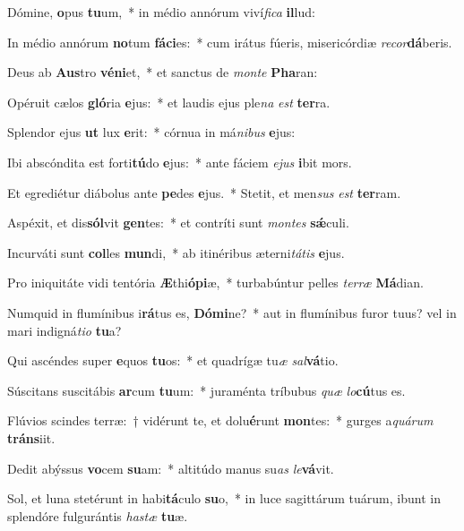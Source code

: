 \item Dómine, \textbf{o}pus \textbf{tu}um,~* in médio annórum viví\textit{fi}\textit{ca} \textbf{il}lud:
\item In médio annórum \textbf{no}tum \textbf{fá}\textbf{ci}es:~* cum irátus fúeris, misericórdiæ \textit{re}\textit{cor}\textbf{dá}beris.
\item Deus ab \textbf{Aus}tro \textbf{vé}\textbf{ni}et,~* et sanctus de \textit{mon}\textit{te} \textbf{Pha}ran:
\item Opéruit cælos \textbf{gló}ria \textbf{e}jus:~* et laudis ejus ple\textit{na} \textit{est} \textbf{ter}ra.
\item Splendor ejus \textbf{ut} lux \textbf{e}rit:~* córnua in má\textit{ni}\textit{bus} \textbf{e}jus:
\item Ibi abscóndita est forti\textbf{tú}do \textbf{e}jus:~* ante fáciem \textit{e}\textit{jus} \textbf{i}bit mors.
\item Et egrediétur diábolus ante \textbf{pe}des \textbf{e}jus.~* Stetit, et men\textit{sus} \textit{est} \textbf{ter}ram.
\item Aspéxit, et dis\textbf{sól}vit \textbf{gen}tes:~* et contríti sunt \textit{mon}\textit{tes} \textbf{sǽ}culi.
\item Incurváti sunt \textbf{col}les \textbf{mun}di,~* ab itinéribus æterni\textit{tá}\textit{tis} \textbf{e}jus.
\item Pro iniquitáte vidi tentória \textbf{Æ}thi\textbf{ó}\textbf{pi}æ,~* turbabúntur pelles \textit{ter}\textit{ræ} \textbf{Má}dian.
\item Numquid in flumínibus i\textbf{rá}tus es, \textbf{Dó}\textbf{mi}ne?~* aut in flumínibus furor tuus? vel in mari indigná\textit{ti}\textit{o} \textbf{tu}a?
\item Qui ascéndes super \textbf{e}quos \textbf{tu}os:~* et quadrígæ tu\textit{æ} \textit{sal}\textbf{vá}tio.
\item Súscitans suscitábis \textbf{ar}cum \textbf{tu}um:~* juraménta tríbubus \textit{quæ} \textit{lo}\textbf{cú}tus es.
\item Flúvios scindes terræ:~† vidérunt te, et dolu\textbf{é}runt \textbf{mon}tes:~* gurges a\textit{quá}\textit{rum} \textbf{tráns}iit.
\item Dedit abýssus \textbf{vo}cem \textbf{su}am:~* altitúdo manus su\textit{as} \textit{le}\textbf{vá}vit.
\item Sol, et luna stetérunt in habi\textbf{tá}culo \textbf{su}o,~* in luce sagittárum tuárum, ibunt in splendóre fulgurántis \textit{has}\textit{tæ} \textbf{tu}æ.
